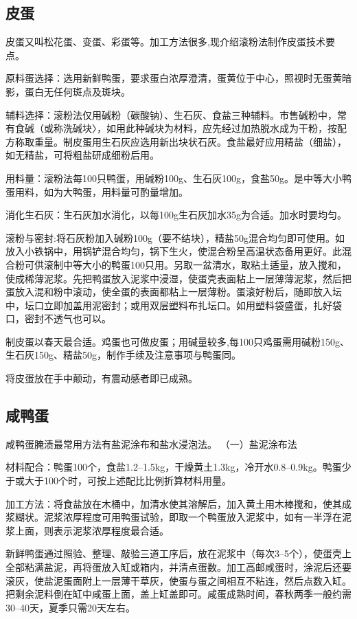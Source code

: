 \documentclass{ctexbook}
\begin{document}
\subsection{皮蛋}
皮蛋又叫松花蛋、变蛋、彩蛋等。加工方法很多,现介绍滚粉法制作皮蛋技术要点。

原料蛋选择：选用新鲜鸭蛋，要求蛋白浓厚澄清，蛋黄位于中心，照视时无蛋黄暗影，蛋白无任何斑点及斑块。

辅料选择：滚粉法仅用碱粉（碳酸钠）、生石灰、食盐三种辅料。市售碱粉中，常有食碱（或称洗碱块〉，如用此种碱块为材料，应先经过加热脱水成为干粉，按配方称取重量。制皮蛋用生石灰应选用新出块状石灰。食盐最好应用精盐（细盐），如无精盐，可将粗盐研成细粉后用。

用料量：滚粉法每100只鸭蛋，用碱粉100g、生石灰100g，食盐50g。是中等大小鸭蛋用料，如为大鸭蛋，用料量可酌量增加。

消化生石灰：生石灰加水消化，以每100g生石灰加水35g为合适。加水时要均匀。

滚粉与密封:将石灰粉加入碱粉100g（要不结块），精盐50g混合均匀即可使用。如放入小铁锅中，用锅铲混合均匀，锅下生火，使混合粉呈高温状态备用更好。此混合粉可供滚制中等大小的鸭蛋100只用。另取一盆清水，取粘土适量，放入搅和，使成稀薄泥浆。先把鸭蛋放入泥浆中浸湿，使蛋壳表面粘上一层薄薄泥浆，然后把蛋放入混和粉中滚动，使全蛋的表面都粘上一层薄粉。蛋滚好粉后，随即放入坛中，坛口立即加盖用泥密封；或用双层塑料布扎坛口。如用塑料袋盛蛋，扎好袋口，密封不透气也可以。

制皮蛋以春天最合适。鸡蛋也可做皮蛋；用碱量较多,每100只鸡蛋需用碱粉150g、生石灰150g、精盐50g，制作手续及注意事项与鸭蛋同。

将皮蛋放在手中颠动，有震动感者即已成熟。
\subsection{咸鸭蛋}
咸鸭蛋腌渍最常用方法有盐泥涂布和盐水浸泡法。
（一）盐泥涂布法

材料配合：鸭蛋100个，食盐1.2--1.5kg，干燥黄土1.3kg，冷开水0.8--0.9kg。鸭蛋少于或大于100个时，可按上述配比比例折算材料用量。

加工方法：将食盐放在木桶中，加清水使其溶解后，加入黄土用木棒搅和，使其成浆糊状。泥浆浓厚程度可用鸭蛋试验，即取一个鸭蛋放入泥浆中，如有一半浮在泥浆上面，则表示泥浆浓厚程度最合适。

新鲜鸭蛋通过照验、整理、敲验三道工序后，放在泥浆中（每次3--5个），使蛋壳上全部粘满盐泥，再将蛋放入缸或箱内，并清点蛋数。加工高邮咸蛋时，涂泥后还要滚灰，使盐泥蛋面附上一层薄干草灰，使蛋与蛋之间相互不粘连，然后点数入缸。把剩余泥料倒在缸中咸蛋上面，盖上缸盖即可。咸蛋成熟时间，春秋两季一般约需30--40天，夏季只需20天左右。
\end{document}

